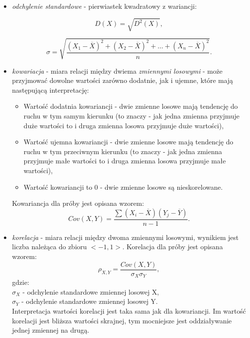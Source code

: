 \documentclass[magister]{dyplom}
\begin{document}
\begin{itemize}
\item \textit{odchylenie standardowe} - pierwiastek kwadratowy z wariancji: \newline

\begin{equation}
	D(X) = \sqrt{D^2(X)},
\end{equation}

\begin{equation}
	\sigma = \sqrt{\frac{(X_1 - \overline{X})^2 + (X_2 - \overline{X})^2 + \dots + (X_n - \overline{X})^2}{n}}.
\end{equation}
\newpage
\item \textit{kowariacja} - miara relacji między dwiema \textit{zmiennymi losowymi} - może przyjmować dowolne wartości zarówno dodatnie, jak i ujemne, które mają następującą interpretację:
\begin{itemize}
	\item Wartość dodatnia kowariancji - dwie zmienne losowe mają tendencję do ruchu w tym samym kierunku (to znaczy - jak jedna zmienna przyjmuje duże wartości to i druga zmienna losowa przyjmuje duże wartości),
	\item Wartość ujemna kowariancji - dwie zmienne losowe mają tendencję do ruchu w tym przeciwnym kierunku (to znaczy - jak jedna zmienna przyjmuje małe wartości to i druga zmienna losowa przyjmuje małe wartości),
	\item Wartość kowariancji to 0 - dwie zmienne losowe są nieskorelowane.
\end{itemize}

Kowariancja dla próby jest opisana wzorem:
\begin{equation}
	Cov(X,Y) = \frac{\sum(X_i - \overline{X})(Y_j - \overline{Y})}{n - 1}.
\end{equation}

\item \textit{korelacja} - miara relacji między dwoma zmiennymi losowymi, wynikiem jest liczba należąca do zbioru $<-1,1>$. Korelacja dla próby jest opisana wzorem:
\begin{equation}
	\rho_{X,Y} = \frac{Cov(X,Y)}{\sigma_X\sigma_Y},
\end{equation}
gdzie:\\
$\sigma_X$ - odchylenie standardowe zmiennej losowej X,\\
$\sigma_Y$ - odchylenie standardowe zmiennej losowej Y.\\

Interpretacja wartości korelacji jest taka sama jak dla kowariancji. Im wartość korelacji jest bliższa wartości skrajnej, tym mocniejsze jest oddziaływanie jednej zmiennej na drugą.\\


\end{itemize}
\end{document}
